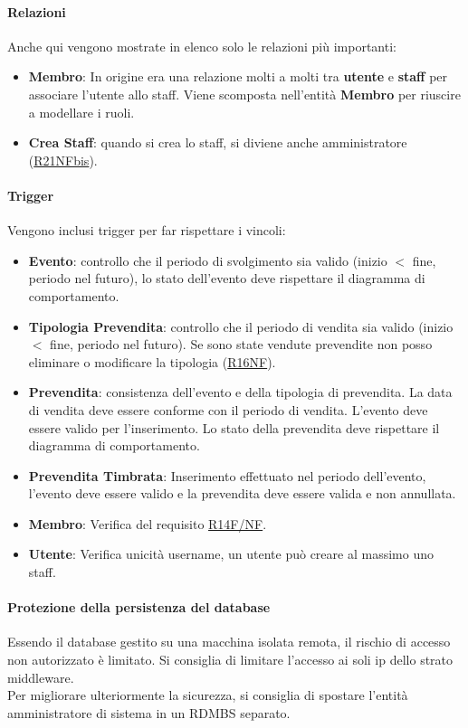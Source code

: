 \documentclass[a4paper]{article}
\begin{document}
\paragraph{Relazioni} Anche qui vengono mostrate in elenco solo le relazioni più importanti:
\begin{itemize}
    \item \textbf{Membro}: In origine era una relazione molti a molti tra \textbf{utente} e \textbf{staff} per associare l'utente allo staff. Viene scomposta nell'entità \textbf{Membro} per riuscire a modellare i ruoli.
    \item \textbf{Crea Staff}: quando si crea lo staff, si diviene anche amministratore (\hyperlink{R21NFbis}{R21NFbis}).
\end{itemize}

\paragraph{Trigger} Vengono inclusi trigger per far rispettare i vincoli:

\begin{itemize}
    \item \textbf{Evento}: controllo che il periodo di svolgimento sia valido (inizio $<$ fine, periodo nel futuro), lo stato dell'evento deve rispettare il diagramma di comportamento.
    \item \textbf{Tipologia Prevendita}: controllo che il periodo di vendita sia valido (inizio $<$ fine, periodo nel futuro). Se sono state vendute prevendite non posso eliminare o modificare la tipologia (\hyperlink{R16NF}{R16NF}).
    \item \textbf{Prevendita}: consistenza dell'evento e della tipologia di prevendita. La data di vendita deve essere conforme con il periodo di vendita. L'evento deve essere valido per l'inserimento. Lo stato della prevendita deve rispettare il diagramma di comportamento.
    \item \textbf{Prevendita Timbrata}: Inserimento effettuato nel periodo dell'evento, l'evento deve essere valido e la prevendita deve essere valida e non annullata.
    \item \textbf{Membro}: Verifica del requisito \hyperlink{R14F/NF}{R14F/NF}.
    \item \textbf{Utente}: Verifica unicità username, un utente può creare al massimo uno staff.
\end{itemize}

\paragraph{Protezione della persistenza del database} Essendo il database gestito su una macchina isolata remota, il rischio di accesso non autorizzato è limitato. Si consiglia di limitare l'accesso ai soli ip dello strato middleware.\\Per migliorare ulteriormente la sicurezza, si consiglia di spostare l'entità amministratore di sistema in un RDMBS separato.
\end{document}
